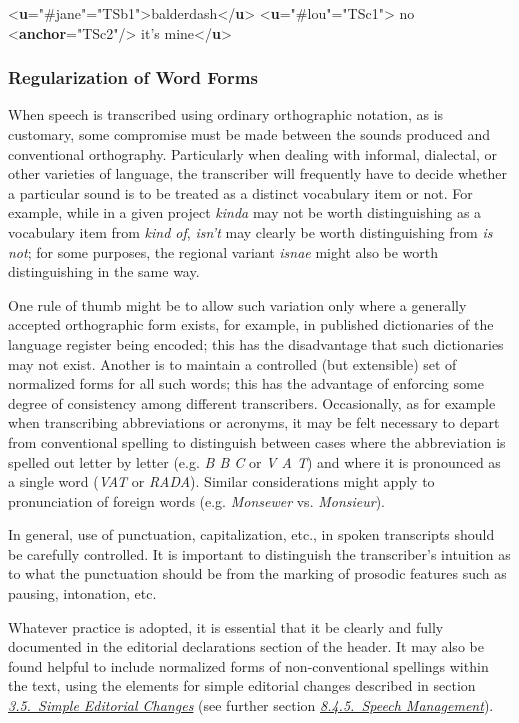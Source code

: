 \begin{shaded}
{<\textbf{u}\hspace*{1em}{who}="{\#jane}"\hspace*{1em}{xml:id}="{TSb1}">}balderdash{</\textbf{u}>}\mbox{}\newline 
{<\textbf{u}\hspace*{1em}{who}="{\#lou}"\hspace*{1em}{xml:id}="{TSc1}">} no {<\textbf{anchor}\hspace*{1em}{xml:id}="{TSc2}"/>} it's mine{</\textbf{u}>}\end{shaded}\egroup\par 
\subsubsection[{Regularization of Word Forms}]{Regularization of Word Forms}\label{TSREG}\par
When speech is transcribed using ordinary orthographic notation, as is customary, some compromise must be made between the sounds produced and conventional orthography. Particularly when dealing with informal, dialectal, or other varieties of language, the transcriber will frequently have to decide whether a particular sound is to be treated as a distinct vocabulary item or not. For example, while in a given project \textit{kinda} may not be worth distinguishing as a vocabulary item from \textit{kind of}, \textit{isn't} may clearly be worth distinguishing from \textit{is not}; for some purposes, the regional variant \textit{isnae} might also be worth distinguishing in the same way.\par
One rule of thumb might be to allow such variation only where a generally accepted orthographic form exists, for example, in published dictionaries of the language register being encoded; this has the disadvantage that such dictionaries may not exist. Another is to maintain a controlled (but extensible) set of normalized forms for all such words; this has the advantage of enforcing some degree of consistency among different transcribers. Occasionally, as for example when transcribing abbreviations or acronyms, it may be felt necessary to depart from conventional spelling to distinguish between cases where the abbreviation is spelled out letter by letter (e.g. \textit{B B C} or \textit{V A T}) and where it is pronounced as a single word (\textit{VAT} or \textit{RADA}). Similar considerations might apply to pronunciation of foreign words (e.g. \textit{Monsewer} vs. \textit{Monsieur}).\par
In general, use of punctuation, capitalization, etc., in spoken transcripts should be carefully controlled. It is important to distinguish the transcriber's intuition as to what the punctuation should be from the marking of prosodic features such as pausing, intonation, etc.\par
Whatever practice is adopted, it is essential that it be clearly and fully documented in the editorial declarations section of the header. It may also be found helpful to include normalized forms of non-conventional spellings within the text, using the elements for simple editorial changes described in section \textit{\hyperref[COED]{3.5.\ Simple Editorial Changes}} (see further section \textit{\hyperref[TSTPSM]{8.4.5.\ Speech Management}}).
